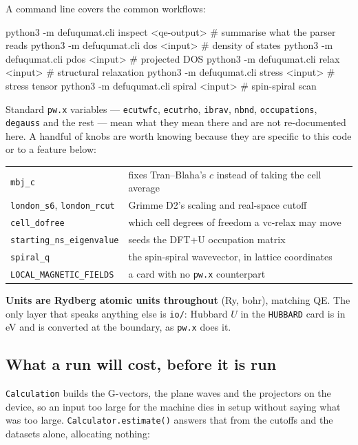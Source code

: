 \documentclass[11pt,a4paper]{article}
\newcommand{\code}[1]{\texttt{\small #1}}
\begin{document}
A command line covers the common workflows:

\begin{shcode}
python3 -m defuqumat.cli inspect <qe-output>   # summarise what the parser reads
python3 -m defuqumat.cli dos     <input>       # density of states
python3 -m defuqumat.cli pdos    <input>       # projected DOS
python3 -m defuqumat.cli relax   <input>       # structural relaxation
python3 -m defuqumat.cli stress  <input>       # stress tensor
python3 -m defuqumat.cli spiral  <input>       # spin-spiral scan
\end{shcode}

Standard \code{pw.x} variables --- \code{ecutwfc}, \code{ecutrho}, \code{ibrav},
\code{nbnd}, \code{occupations}, \code{degauss} and the rest --- mean what they
mean there and are not re-documented here. A handful of knobs are worth knowing
because they are specific to this code or to a feature below:

\begin{center}
\small
\begin{tabular}{@{}ll@{}}
\toprule
\code{mbj\_c} & fixes Tran--Blaha's $c$ instead of taking the cell average \\
\code{london\_s6}, \code{london\_rcut} & Grimme D2's scaling and real-space cutoff \\
\code{cell\_dofree} & which cell degrees of freedom a vc-relax may move \\
\code{starting\_ns\_eigenvalue} & seeds the DFT+U occupation matrix \\
\code{spiral\_q} & the spin-spiral wavevector, in lattice coordinates \\
\code{LOCAL\_MAGNETIC\_FIELDS} & a card with no \code{pw.x} counterpart \\
\bottomrule
\end{tabular}
\end{center}

\textbf{Units are Rydberg atomic units throughout} (Ry, bohr), matching QE. The
only layer that speaks anything else is \code{io/}: Hubbard $U$ in the
\code{HUBBARD} card is in eV and is converted at the boundary, as \code{pw.x}
does it.

\subsection*{What a run will cost, before it is run}

\code{Calculation} builds the G-vectors, the plane waves and the projectors on
the device, so an input too large for the machine dies in setup without saying
what was too large. \code{Calculator.estimate()} answers that from the cutoffs
and the datasets alone, allocating nothing:
\end{document}
